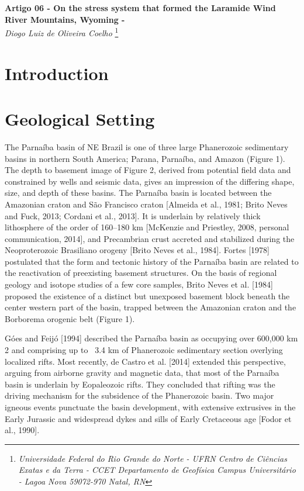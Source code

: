 \documentclass[long]{geophysics}
\begin{document}
\begin{center}
\textbf{\LARGE
 Artigo 06 - On the stress system that formed the Laramide Wind River Mountains, Wyoming - \cite{brewer_stress_1980}} \\
\textit{Diogo Luiz de Oliveira Coelho}
\footnote{\textit{Universidade Federal do Rio Grande do Norte - UFRN
Centro de Ciências Exatas e da Terra - CCET
Departamento de Geofísica
Campus Universitário - Lagoa Nova
59072-970 Natal, RN}}
\end{center} 


\section{Introduction}



\section{Geological Setting}
The Parnaíba basin of NE Brazil is one of three large Phanerozoic sedimentary basins in northern South America; Parana, Parnaíba, and Amazon (Figure 1). The depth to basement image of Figure 2, derived from potential field data and constrained by wells and seismic data, gives an impression of the differing shape, size, and depth of these basins. The Parnaíba basin is located between the Amazonian craton and São Francisco craton [Almeida et al., 1981; Brito Neves and Fuck, 2013; Cordani et al., 2013]. It is underlain by relatively thick lithosphere of the order of 160–180 km [McKenzie and Priestley, 2008, personal communication,  2014], and Precambrian crust accreted and stabilized during the Neoproterozoic Brasiliano orogeny [Brito Neves et al., 1984]. Fortes [1978] postulated that the form and tectonic history of the Parnaíba basin
are related to the reactivation of preexisting basement structures. On the basis of regional geology and isotope studies of a few core samples, Brito Neves et al. [1984] proposed the existence of a distinct but unexposed basement block beneath the center western part of the basin, trapped between the Amazonian craton and the Borborema orogenic belt (Figure 1).

Góes and Feijó [1994] described the Parnaíba basin as occupying over
600,000 km 2 and comprising up to ~3.4 km of Phanerozoic sedimentary
section overlying localized rifts. Most recently, de Castro et al. [2014]
extended this perspective, arguing from airborne gravity and magnetic data, that
most of the Parnaíba basin is underlain by Eopaleozoic rifts. They concluded
that rifting was the driving mechanism for the subsidence of the Phanerozoic
basin. Two major igneous events punctuate the basin development, with
extensive extrusives in the Early Jurassic and widespread dykes and sills of Early Cretaceous age [Fodor et al., 1990].
\end{document}
